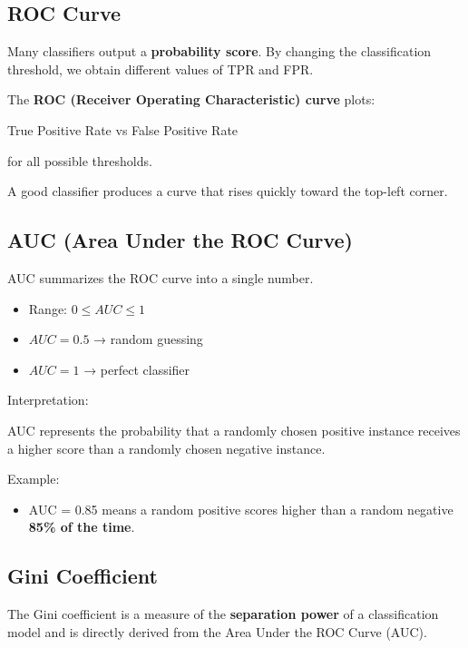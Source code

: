 \documentclass[10pt,a4paper]{article}
\begin{document}
	\subsection{ROC Curve}

	Many classifiers output a \textbf{probability score}.
	By changing the classification threshold, we obtain different values of TPR and FPR.

	The \textbf{ROC (Receiver Operating Characteristic) curve} plots:

	\begin{center}
		True Positive Rate vs False Positive Rate
	\end{center}

	for all possible thresholds.

	A good classifier produces a curve that rises quickly toward the top-left corner.

	\subsection{AUC (Area Under the ROC Curve)}

	AUC summarizes the ROC curve into a single number.

	\begin{itemize}
		\item Range: $0 \le AUC \le 1$
		\item $AUC = 0.5$ → random guessing
		\item $AUC = 1$ → perfect classifier
	\end{itemize}

	Interpretation:


		\begin{center}
			AUC represents the probability that a randomly chosen positive instance receives a higher score than a randomly chosen negative instance.
		\end{center}


	Example:

	\begin{itemize}
		\item AUC = 0.85 means a random positive scores higher than a random negative \textbf{85\% of the time}.
	\end{itemize}

	\subsection{Gini Coefficient}

	The Gini coefficient is a measure of the \textbf{separation power} of a classification model and is directly derived from the Area Under the ROC Curve (AUC).
\end{document}
